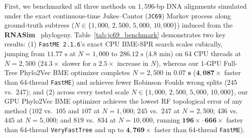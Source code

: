 \documentclass[11pt,a4paper]{article}
\makeatletter
\DeclareRobustCommand{\_}{\ifmmode\nfss@text{\textunderscore}\else\textunderscore\allowbreak\fi}
\theoremstyle{definition}
\makeatother
\begin{document}
First, we benchmarked all three methods on $1{,}596$-bp DNA alignments simulated under the exact continuous-time Jukes--Cantor (\texttt{JC69}) Markov process along ground-truth subtrees ($N \in \{1{,}000, \, 2{,}500, \, 5{,}000, \, 10{,}000\}$) induced from the \textbf{RNASim}~\cite{mirarab2015pasta} phylogeny. Table~\ref{tab:jc69_benchmark} demonstrates two key results: (1) \texttt{FastME 2.1.6}'s exact CPU BME-SPR search scales cubically, jumping from $11.77\text{ s}$ at $N = 1{,}000$ to $286.12\text{ s}$ ($4.8\text{ min}$) on 64 CPU threads at $N = 2{,}500$ ($24.3\times$ slower for a $2.5\times$ increase in $N$), whereas our 1-GPU Full-Tree Phylo2Vec BME optimizer completes $N = 2{,}500$ in $\mathbf{0.07\text{ s}}$ ($\mathbf{4{,}087\times}$ faster than 64-thread \texttt{FastME}) and achieves fewer Robinson--Foulds wrong splits ($245$ vs.\ $247$); and (2) across every tested scale $N \in \{1{,}000, \, 2{,}500, \, 5{,}000, \, 10{,}000\}$, our GPU Phylo2Vec BME optimizer achieves the lowest RF topological error of any method ($102$ vs.\ $105$ and $107$ at $N = 1{,}000$; $245$ vs.\ $247$ at $N = 2{,}500$; $436$ vs.\ $445$ at $N = 5{,}000$; and $819$ vs.\ $834$ at $N = 10{,}000$, running $\mathbf{196\times\text{--}666\times}$ faster than 64-thread \texttt{VeryFastTree} and up to $\mathbf{4{,}769\times}$ faster than 64-thread \texttt{FastME}).
\end{document}
